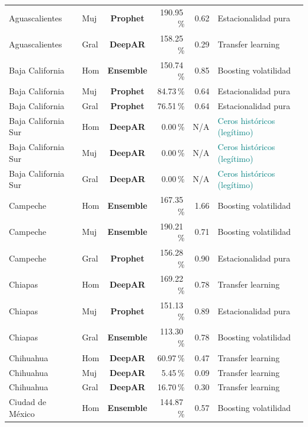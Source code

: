 \documentclass[12pt, letterpaper]{article}
\begin{document}
\begin{longtable}{l l >{\bfseries}c r r l}
Aguascalientes & Muj & \textcolor{cprophet}{\textbf{Prophet}} & 190.95\,\% & 0.62 & Estacionalidad pura \\
Aguascalientes & Gral & \textcolor{cdeepar}{\textbf{DeepAR}} & 158.25\,\% & 0.29 & Transfer learning \\
Baja California & Hom & \textcolor{censemble}{\textbf{Ensemble}} & 150.74\,\% & 0.85 & Boosting volatilidad \\
Baja California & Muj & \textcolor{cprophet}{\textbf{Prophet}} & 84.73\,\% & 0.64 & Estacionalidad pura \\
Baja California & Gral & \textcolor{cprophet}{\textbf{Prophet}} & 76.51\,\% & 0.64 & Estacionalidad pura \\
Baja California Sur & Hom & \textcolor{cdeepar}{\textbf{DeepAR}} & 0.00\,\% & N/A & \textcolor{teal}{Ceros históricos (legítimo)} \\
Baja California Sur & Muj & \textcolor{cdeepar}{\textbf{DeepAR}} & 0.00\,\% & N/A & \textcolor{teal}{Ceros históricos (legítimo)} \\
Baja California Sur & Gral & \textcolor{cdeepar}{\textbf{DeepAR}} & 0.00\,\% & N/A & \textcolor{teal}{Ceros históricos (legítimo)} \\
Campeche & Hom & \textcolor{censemble}{\textbf{Ensemble}} & 167.35\,\% & 1.66 & Boosting volatilidad \\
Campeche & Muj & \textcolor{censemble}{\textbf{Ensemble}} & 190.21\,\% & 0.71 & Boosting volatilidad \\
Campeche & Gral & \textcolor{cprophet}{\textbf{Prophet}} & 156.28\,\% & 0.90 & Estacionalidad pura \\
Chiapas & Hom & \textcolor{cdeepar}{\textbf{DeepAR}} & 169.22\,\% & 0.78 & Transfer learning \\
Chiapas & Muj & \textcolor{cprophet}{\textbf{Prophet}} & 151.13\,\% & 0.89 & Estacionalidad pura \\
Chiapas & Gral & \textcolor{censemble}{\textbf{Ensemble}} & 113.30\,\% & 0.78 & Boosting volatilidad \\
Chihuahua & Hom & \textcolor{cdeepar}{\textbf{DeepAR}} & 60.97\,\% & 0.47 & Transfer learning \\
Chihuahua & Muj & \textcolor{cdeepar}{\textbf{DeepAR}} & 5.45\,\% & 0.09 & Transfer learning \\
Chihuahua & Gral & \textcolor{cdeepar}{\textbf{DeepAR}} & 16.70\,\% & 0.30 & Transfer learning \\
Ciudad de México & Hom & \textcolor{censemble}{\textbf{Ensemble}} & 144.87\,\% & 0.57 & Boosting volatilidad \\

\end{longtable}
\end{document}
